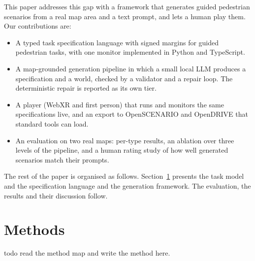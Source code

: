 \documentclass[preprint,12pt]{elsarticle}
\begin{document}
This paper addresses this gap with a framework that generates guided pedestrian scenarios from a real map area and a text prompt, and lets a human play them. Our contributions are:
\begin{itemize}
  \item A typed task specification language with signed margins for guided pedestrian tasks, with one monitor implemented in Python and TypeScript.
  \item A map-grounded generation pipeline in which a small local LLM produces a specification and a world, checked by a validator and a repair loop. The deterministic repair is reported as its own tier.
  \item A player (WebXR and first person) that runs and monitors the same specifications live, and an export to OpenSCENARIO and OpenDRIVE that standard tools can load.
  \item An evaluation on two real maps: per-type results, an ablation over three levels of the pipeline, and a human rating study of how well generated scenarios match their prompts.
\end{itemize}

The rest of the paper is organised as follows. Section~\ref{sec:methods} presents the task model and the specification language and the generation framework. The evaluation, the results and their discussion follow.

\section{Methods}
\label{sec:methods}

todo read the method map and write the method here.
\end{document}
